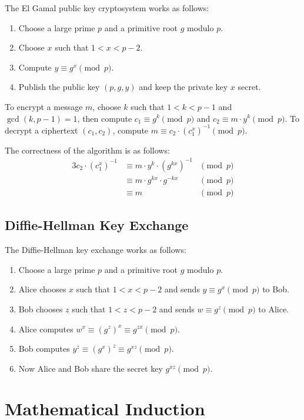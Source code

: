 \documentclass[a4paper,12pt]{article}
\begin{document}
The El Gamal public key cryptosystem works as follows:
\begin{enumerate}
	\item Choose a large prime $p$ and a primitive root $g$ modulo $p$.
	\item Choose $x$ such that $1 < x < p-2$.
	\item Compute $y \equiv g^x \pmod{p}$.
	\item Publish the public key $(p,g,y)$ and keep the private key $x$ secret.
\end{enumerate}

To encrypt a message $m$, choose $k$ such that $1 < k < p-1$ and $\gcd(k,p-1) = 1$, then compute $c_1 \equiv g^k \pmod{p}$ and $c_2 \equiv m \cdot y^k \pmod{p}$.
To decrypt a ciphertext $(c_1, c_2)$, compute $m \equiv c_2 \cdot (c_1^x)^{-1} \pmod{p}$.

The correctness of the algorithm is as follows:
\begin{alignat*}{3}
	c_2 \cdot (c_1^x)^{-1} &\equiv m \cdot y^k \cdot (g^{kx})^{-1} &\pmod{p} \\
	&\equiv m \cdot g^{kx} \cdot g^{-kx} &\pmod{p} \\
	&\equiv m &\pmod{p}
\end{alignat*}

\subsection{Diffie-Hellman Key Exchange}

The Diffie-Hellman key exchange works as follows:
\begin{enumerate}
	\item Choose a large prime $p$ and a primitive root $g$ modulo $p$.
	\item Alice chooses $x$ such that $1 < x < p-2$ and sends $y \equiv g^x \pmod{p}$ to Bob.
	\item Bob chooses $z$ such that $1 < z < p-2$ and sends $w \equiv g^z \pmod{p}$ to Alice.
	\item Alice computes $w^x \equiv (g^z)^x \equiv g^{zx} \pmod{p}$.
	\item Bob computes $y^z \equiv (g^x)^z \equiv g^{xz} \pmod{p}$.
	\item Now Alice and Bob share the secret key $g^{xz} \pmod{p}$.
\end{enumerate}

\section{Mathematical Induction}
\end{document}
